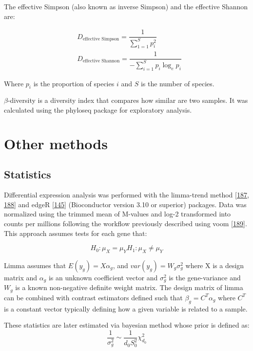 \documentclass[
  12pt,
  a4paper,
  twoside,
  openright]{book}
\begin{document}
The effective Simpson (also known as inverse Simpson) and the effective Shannon are:

\[
\begin{aligned}
& D_{\text{effective Simpson}} = \dfrac{1}{\sum_{1=1}^Sp_i^2} \\
& D_{\text{effective Shannon}} = \dfrac{1}{-\sum_{i =1}^S p_i \log_e{p_i}}
\end{aligned}
\]

Where \(p_i\) is the proportion of species \(i\) and \(S\) is the number of species.

\(\beta\)-diversity is a diversity index that compares how similar are two samples.
It was calculated using the phyloseq package for exploratory analysis.

\hypertarget{other-methods}{%
\section{Other methods}\label{other-methods}}

\hypertarget{statistics}{%
\subsection{Statistics}\label{statistics}}

Differential expression analysis was performed with the limma-trend method {[}\protect\hyperlink{ref-ritchie2015}{187}, \protect\hyperlink{ref-law2014}{188}{]} and edgeR {[}\protect\hyperlink{ref-mccarthy2012}{145}{]} (Bioconductor version 3.10 or superior) packages.
Data was normalized using the trimmed mean of M-values and log-2 transformed into counts per millions following the workflow previously described using voom {[}\protect\hyperlink{ref-law2018}{189}{]}.
This approach assumes tests for each gene that:

\[
H_0 : \mu_{X} = \mu_{Y}
H_1 : \mu_{X} \neq \mu_{Y}
\]

Limma assumes that \(E(y_g) = X \alpha_g\), and \(var(y_g) = W_g \sigma_g^2\) where X is a design matrix and \(\alpha_g\) is an unknown coefficient vector and \(\sigma_g^2\) is the gene-variance and \(W_g\) is a known non-negative definite weight matrix.
The design matrix of limma can be combined with contrast estimators defined such that \(\beta_g = C^T \alpha_g\) where \(C^T\) is a constant vector typically defining how a given variable is related to a sample.

These statistics are later estimated via bayesian method whose prior is defined as:
\[
\dfrac{1}{\sigma_g^2} \sim \dfrac{1}{d_0 S_0^2} \chi_{d_0}^2
\]
\end{document}
